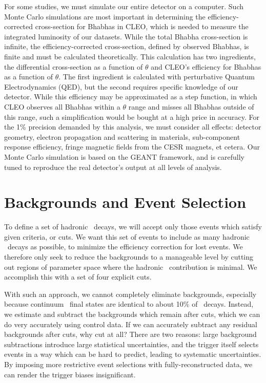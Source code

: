 \documentclass{cornell}
\begin{document}
For some studies, we must simulate our entire detector on a computer.
Such Monte Carlo simulations are most important in determining the
efficiency-corrected cross-section for Bhabhas in CLEO, which is
needed to measure the integrated luminosity of our datasets.  While
the total Bhabha cross-section is infinite, the efficiency-corrected
cross-section, defined by observed Bhabhas, is finite and must be
calculated theoretically.  This calculation has two ingredients, the
differential cross-section as a function of $\theta$ and CLEO's
efficiency for Bhabhas as a function of $\theta$.  The first
ingredient is calculated with perturbative Quantum Electrodynamics
(QED), but the second requires specific knowledge of our detector.
While this efficiency may be approximated as a step function, in which
CLEO observes all Bhabhas within a $\theta$ range and misses all
Bhabhas outside of this range, such a simplification would be bought at a
high price in accuracy.  For the 1\% precision demanded by this
analysis, we must consider all effects: detector geometry, electron
propagation and scattering in materials, sub-component response
efficiency, fringe magnetic fields from the CESR magnets, et cetera.
Our Monte Carlo simulation is based on the GEANT framework, and is
carefully tuned to reproduce the real detector's output at all levels
of analysis.

\chapter{Backgrounds and Event Selection}
\label{chp:backgrounds}

To define a set of hadronic \ups\ decays, we will accept only those
events which satisfy given criteria, or cuts.  We want this set of
events to include as many hadronic \ups\ decays as possible, to
minimize the efficiency correction for lost events.  We therefore only
seek to reduce the backgrounds to a manageable level by cutting out
regions of parameter space where the hadronic \ups\ contribution is
minimal.  We accomplish this with a set of four explicit cuts.

With such an approach, we cannot completely eliminate backgrounds,
especially because continuum \qqbar\ final states are identical to
about 10\% of \ups\ decays.  Instead, we estimate and subtract the
backgrounds which remain after cuts, which we can do very accurately
using control data.  If we can accurately subtract any residual
backgrounds after cuts, why cut at all?  There are two reasons: large
background subtractions introduce large statistical uncertainties, and
the trigger itself selects events in a way which can be hard to
predict, leading to systematic uncertainties.  By imposing more
restrictive event selections with fully-reconstructed data, we can
render the trigger biases insignificant.
\end{document}
